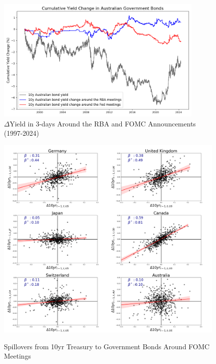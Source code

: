 \begin{figure}[!htbp]
    \centering
    \caption{$\Delta$Yield in 3-days Around the RBA and FOMC Announcements (1997-2024)}    \includegraphics[width=0.9\textwidth]{figures/1997_australian_bonds_figure1a.png}

    \label{fig:rba1997}
\end{figure}

\newpage

\begin{figure}[!htbp]
    \caption{Spillovers from 10yr Treasury to Government Bonds Around FOMC Meetings}
    \centering
    \includegraphics[width=\textwidth]{figures/bondspillovers.png}
    \label{fig:spillovers}
\end{figure}

